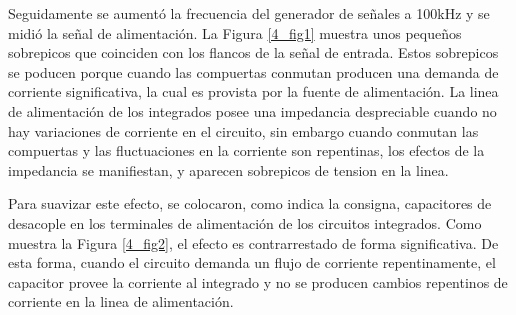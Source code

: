 \bigskip
Seguidamente se aumentó la frecuencia del generador de señales a 100kHz y se midió la señal de alimentación. La Figura \ref{4_fig1} muestra unos pequeños sobrepicos que coinciden con los flancos de la señal de entrada. Estos sobrepicos se poducen porque cuando las compuertas conmutan producen una demanda de corriente significativa, la cual es provista por la fuente de alimentación. La linea de alimentación de los integrados posee una impedancia despreciable cuando no hay variaciones de corriente en el circuito, sin embargo cuando conmutan las compuertas y las fluctuaciones en la corriente son repentinas, los efectos de la impedancia se manifiestan, y aparecen sobrepicos de tension en la linea.

Para suavizar este efecto, se colocaron, como indica la consigna, capacitores de desacople en los terminales de alimentación de los circuitos integrados. Como muestra la Figura \ref{4_fig2}, el efecto es contrarrestado de forma significativa. De esta forma, cuando el circuito demanda un flujo de corriente repentinamente, el capacitor provee la corriente al integrado y no se producen cambios repentinos de corriente en la linea de alimentación.


